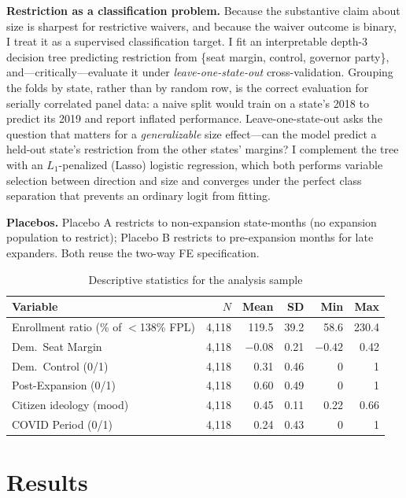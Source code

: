 \documentclass[9pt,twoside]{pnas-new}
\begin{document}
\textbf{Restriction as a classification problem.} Because the substantive claim about size is sharpest for restrictive waivers, and because the waiver outcome is binary, I treat it as a supervised classification target. I fit an interpretable depth-3 decision tree predicting restriction from \{seat margin, control, governor party\}, and---critically---evaluate it under \emph{leave-one-state-out} cross-validation. Grouping the folds by state, rather than by random row, is the correct evaluation for serially correlated panel data: a naive split would train on a state's 2018 to predict its 2019 and report inflated performance. Leave-one-state-out asks the question that matters for a \emph{generalizable} size effect---can the model predict a held-out state's restriction from the other states' margins? I complement the tree with an $L_1$-penalized (Lasso) logistic regression, which both performs variable selection between direction and size and converges under the perfect class separation that prevents an ordinary logit from fitting.

\textbf{Placebos.} Placebo A restricts to non-expansion state-months (no expansion population to restrict); Placebo B restricts to pre-expansion months for late expanders. Both reuse the two-way FE specification.

\begin{table}[htbp]
\centering
\caption{Descriptive statistics for the analysis sample}
\label{tab:desc}
\small
\begin{tabular}{lrrrrr}
\toprule
Variable & $N$ & Mean & SD & Min & Max\\
\midrule
Enrollment ratio (\% of $<$138\% FPL) & 4{,}118 & 119.5 & 39.2 & 58.6 & 230.4\\
Dem.\ Seat Margin & 4{,}118 & $-0.08$ & 0.21 & $-0.42$ & 0.42\\
Dem.\ Control (0/1) & 4{,}118 & 0.31 & 0.46 & 0 & 1\\
Post-Expansion (0/1) & 4{,}118 & 0.60 & 0.49 & 0 & 1\\
Citizen ideology (mood) & 4{,}118 & 0.45 & 0.11 & 0.22 & 0.66\\
COVID Period (0/1) & 4{,}118 & 0.24 & 0.43 & 0 & 1\\
\bottomrule
\end{tabular}
\end{table}

\section*{Results}
\end{document}
